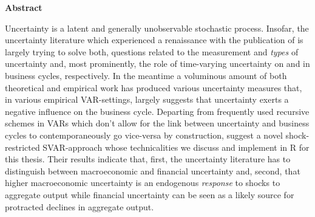 \documentclass[a4paper,11pt,listof=nochaptergap,oneside,pointednumbers,bibtotoc,bigheadings,liststotoc,hidelinks]{scrbook}
\makeatletter
\theoremstyle{mysatz}
\theoremstyle{mydefinition}
\theoremstyle{mytheorem}
\theoremstyle{mybemerkung}
\newcommand\abstractname{Abstract}  %
\newenvironment{abstract}{%
      \titlepage
      \null\vfil
      \@beginparpenalty\@lowpenalty
      \begin{center}%
        \bfseries \abstractname
        \@endparpenalty\@M
      \end{center}}%
     {\par\vfil\null\endtitlepage}
\newenvironment{abstract}{%
      \if@twocolumn
        \section*{\abstractname}%
      \else
        \small
        \begin{center}%
          {\bfseries \abstractname\vspace{-.5em}\vspace{\z@}}%
        \end{center}%
        \quotation
      \fi}
      {\if@twocolumn\else\endquotation\fi}
\makeatother
\begin{document}
\thispagestyle{empty} 
\begin{abstract}
Uncertainty is a latent and generally unobservable stochastic process. Insofar, the uncertainty literature which experienced a renaissance with the publication of \citet{bloom:09} is largely trying to solve both, questions related to the measurement and \textit{types} of uncertainty and, most prominently, the role of time-varying uncertainty on and in business cycles, respectively. In the meantime a voluminous amount of both theoretical and empirical work has produced various uncertainty measures that, in various empirical VAR-settings, largely suggests that uncertainty exerts a negative influence on the business cycle. Departing from frequently used recursive schemes in VARs which don't allow for the link between uncertainty and business cycles to contemporaneously go vice-versa by construction, \citet{ludvigsonetal:18, ludvigsonetal:19} suggest a novel shock-restricted SVAR-approach whose technicalities we discuss and implement in R for this thesis. Their results indicate that, first, the uncertainty literature has to distinguish between macroeconomic and financial uncertainty and, second, that higher macroeconomic uncertainty is an endogenous \textit{response} to shocks to aggregate output while financial uncertainty can be seen as a likely source for protracted declines in aggregate output.
\end{abstract}
\end{document}
